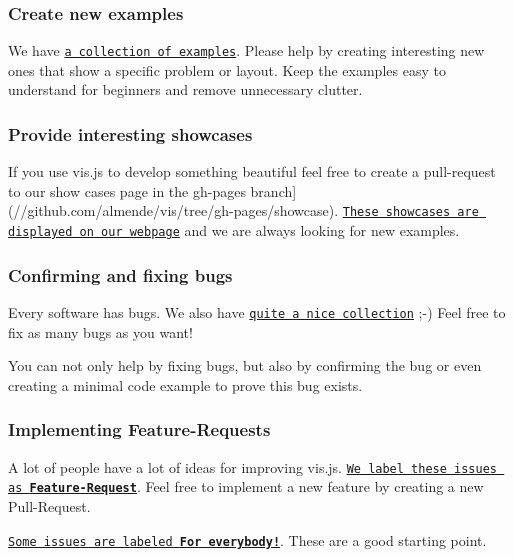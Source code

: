 \subsubsection*{Create new examples}

We have \href{//github.com/almende/vis/tree/develop/examples}{\tt a collection of examples}. Please help by creating interesting new ones that show a specific problem or layout. Keep the examples easy to understand for beginners and remove unnecessary clutter.

\subsubsection*{Provide interesting showcases}

If you use vis.\+js to develop something beautiful feel free to create a pull-\/request to our show cases page in the gh-\/pages branch\mbox{]}(//github.com/almende/vis/tree/gh-\/pages/showcase). \href{http://visjs.org/showcase/index.html}{\tt These showcases are displayed on our webpage} and we are always looking for new examples.

\subsubsection*{Confirming and fixing bugs}

Every software has bugs. We also have \href{https://github.com/almende/vis/issues?q=is%3Aissue+is%3Aopen+label%3ABug+sort%3Areactions-%2B1-desc}{\tt quite a nice collection} ;-\/) Feel free to fix as many bugs as you want!

You can not only help by fixing bugs, but also by confirming the bug or even creating a minimal code example to prove this bug exists.

\subsubsection*{Implementing Feature-\/\+Requests}

A lot of people have a lot of ideas for improving vis.\+js. \href{https://github.com/almende/vis/labels/Feature-Request}{\tt We label these issues as {\bfseries Feature-\/\+Request}}. Feel free to implement a new feature by creating a new Pull-\/\+Request.

\href{//github.com/almende/vis/issues?q=is%3Aissue+is%3Aopen+label%3A%22For+everyone%21%22+sort%3Areactions-%2B1-desc}{\tt Some issues are labeled {\bfseries For everybody!}}. These are a good starting point.

